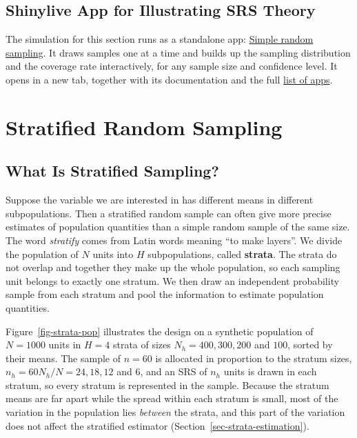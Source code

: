 \documentclass[
  letterpaper,
  DIV=11,
  numbers=noendperiod]{scrreprt}
\renewcommand{\[}{\begin{equation}}
\renewcommand{\]}{\end{equation}}
\begin{document}
\section{Shinylive App for Illustrating SRS Theory}\label{sec-app-srs}

The simulation for this section runs as a standalone app:
\href{../shinylives_sampling/app-srs.html}{Simple random sampling}. It
draws samples one at a time and builds up the sampling distribution and
the coverage rate interactively, for any sample size and confidence
level. It opens in a new tab, together with its documentation and the
full \href{../shinylives_sampling/index.html}{list of apps}.


\chapter{Stratified Random Sampling}\label{stratified-random-sampling}

\section{What Is Stratified Sampling?}\label{sec-strata-intro}

Suppose the variable we are interested in has different means in
different subpopulations. Then a stratified random sample can often give
more precise estimates of population quantities than a simple random
sample of the same size. The word \emph{stratify} comes from Latin words
meaning ``to make layers''. We divide the population of \(N\) units into
\(H\) subpopulations, called \textbf{strata}. The strata do not overlap
and together they make up the whole population, so each sampling unit
belongs to exactly one stratum. We then draw an independent probability
sample from each stratum and pool the information to estimate population
quantities.

Figure~\ref{fig-strata-pop} illustrates the design on a synthetic
population of \(N = 1000\) units in \(H = 4\) strata of sizes
\(N_h = 400, 300, 200\) and \(100\), sorted by their means. The sample
of \(n = 60\) is allocated in proportion to the stratum sizes,
\(n_h = 60 N_h/N = 24, 18, 12\) and \(6\), and an SRS of \(n_h\) units
is drawn in each stratum, so every stratum is represented in the sample.
Because the stratum means are far apart while the spread within each
stratum is small, most of the variation in the population lies
\emph{between} the strata, and this part of the variation does not
affect the stratified estimator (Section~\ref{sec-strata-estimation}).
\end{document}
